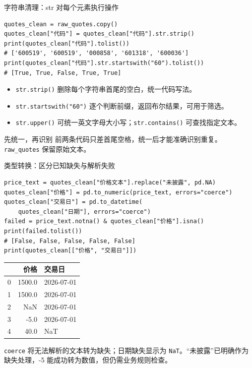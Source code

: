\documentclass[9pt]{ctexbeamer}
\begin{document}
\begin{frame}[fragile]{字符串清理：str 对每个元素执行操作}
\begin{lstlisting}
quotes_clean = raw_quotes.copy()
quotes_clean["代码"] = quotes_clean["代码"].str.strip()
print(quotes_clean["代码"].tolist())
# ['600519', '600519', '000858', '601318', '600036']
print(quotes_clean["代码"].str.startswith("60").tolist())
# [True, True, False, True, True]
\end{lstlisting}
\begin{itemize}
\item \texttt{str.strip()} 删除每个字符串首尾的空白，统一代码写法。
\item \texttt{str.startswith("60")} 逐个判断前缀，返回布尔结果，可用于筛选。
\item \texttt{str.upper()} 可统一英文字母大小写；\texttt{str.contains()} 可查找指定文本。
\end{itemize}
\begin{block}{先统一，再识别}
前两条代码只差首尾空格，统一后才能准确识别重复。\texttt{raw\_quotes} 保留原始文本。
\end{block}
\end{frame}

\begin{frame}[fragile]{类型转换：区分已知缺失与解析失败}
\begin{lstlisting}[basicstyle=\ttfamily\scriptsize]
price_text = quotes_clean["价格文本"].replace("未披露", pd.NA)
quotes_clean["价格"] = pd.to_numeric(price_text, errors="coerce")
quotes_clean["交易日"] = pd.to_datetime(
    quotes_clean["日期"], errors="coerce")
failed = price_text.notna() & quotes_clean["价格"].isna()
print(failed.tolist())
# [False, False, False, False, False]
print(quotes_clean[["价格", "交易日"]])
\end{lstlisting}
\begin{center}
\small
\begin{tabular}{rrl}
\toprule
 & 价格 & 交易日 \\
\midrule
0 & 1500.0 & 2026-07-01 \\
1 & 1500.0 & 2026-07-01 \\
2 & NaN & 2026-07-01 \\
3 & -5.0 & 2026-07-01 \\
4 & 40.0 & NaT \\
\bottomrule
\end{tabular}
\end{center}
\small \texttt{coerce} 将无法解析的文本转为缺失；日期缺失显示为 \texttt{NaT}。“未披露”已明确作为缺失处理，-5 能成功转为数值，但仍需业务规则检查。
\end{frame}
\end{document}
